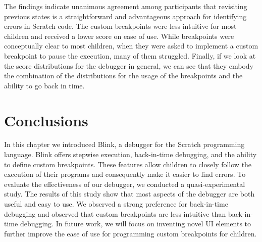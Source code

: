 \documentclass[../main]{subfiles}
\begin{document}
The findings indicate unanimous agreement among participants that revisiting previous states is a straightforward and advantageous approach for identifying errors in Scratch code.
The custom breakpoints were less intuitive for most children and received a lower score on ease of use.
While breakpoints were conceptually clear to most children, when they were asked to implement a custom breakpoint to pause the execution, many of them struggled.
Finally, if we look at the score distributions for the debugger in general, we can see that they embody the combination of the distributions for the usage of the breakpoints and the ability to go back in time.

\section{Conclusions}\label{sec:blink-conclusions}
In this chapter we introduced Blink, a debugger for the Scratch programming language.
Blink offers stepwise execution, back-in-time debugging, and the ability to define custom breakpoints.
These features allow children to closely follow the execution of their programs and consequently make it easier to find errors.
To evaluate the effectiveness of our debugger, we conducted a quasi-experimental study.
The results of this study show that most aspects of the debugger are both useful and easy to use.
We observed a strong preference for back-in-time debugging and observed that custom breakpoints are less intuitive than back-in-time debugging.
In future work, we will focus on inventing novel UI elements to further improve the ease of use for programming custom breakpoints for children.
\end{document}
